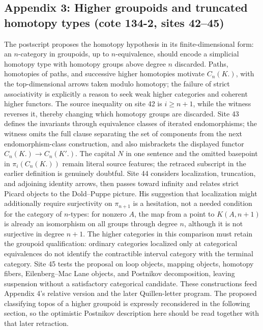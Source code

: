 \subsection*{Appendix 3: Higher groupoids and truncated homotopy types (cote 134-2, sites 42--45)}
The postscript proposes the homotopy hypothesis in its finite-dimensional form: an $n$-category in groupoids, up to $n$-equivalence, should encode a simplicial homotopy type with homotopy groups above degree $n$ discarded. Paths, homotopies of paths, and successive higher homotopies motivate $C_n(K.)$, with the top-dimensional arrows taken modulo homotopy; the failure of strict associativity is explicitly a reason to seek weak higher categories and coherent higher functors. The source inequality on site 42 is $i\geq n+1$, while the witness reverses it, thereby changing which homotopy groups are discarded. Site 43 defines the invariants through equivalence classes of iterated endomorphisms; the witness omits the full clause separating the set of components from the next endomorphism-class construction, and also misbrackets the displayed functor $C_n(K.)\to C_n(K'.)$. The capital $N$ in one sentence and the omitted basepoint in $\pi_i(C_n(K.))$ remain literal source features; the retraced subscript in the earlier definition is genuinely doubtful. Site 44 considers localization, truncation, and adjoining identity arrows, then passes toward infinity and relates strict Picard objects to the Dold--Puppe picture. His suggestion that localization might additionally require surjectivity on $\pi_{n+1}$ is a hesitation, not a needed condition for the category of $n$-types: for nonzero $A$, the map from a point to $K(A,n+1)$ is already an isomorphism on all groups through degree $n$, although it is not surjective in degree $n+1$. The higher categories in this comparison must retain the groupoid qualification: ordinary categories localized only at categorical equivalences do not identify the contractible interval category with the terminal category. Site 45 tests the proposal on loop objects, mapping objects, homotopy fibers, Eilenberg--Mac Lane objects, and Postnikov decomposition, leaving suspension without a satisfactory categorical candidate. These constructions feed Appendix 4's relative version and the later Quillen-letter program. The proposed classifying topos of a higher groupoid is expressly reconsidered in the following section, so the optimistic Postnikov description here should be read together with that later retraction.

